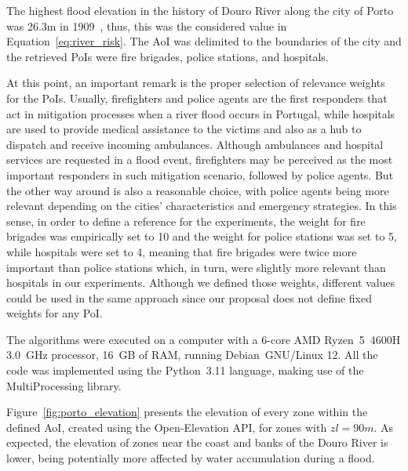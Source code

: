 \begin{refsection}
The highest flood elevation in the history of Douro River along the city of Porto was 26.3m in 1909~\cite{inundacaodouro}, thus, this was the considered value in Equation~\ref{eq:river_risk}. The AoI was delimited to the boundaries of the city and the retrieved PoIs were fire brigades, police stations, and hospitals. 

At this point, an important remark is the proper selection of relevance weights for the PoIs. Usually, firefighters and police agents are the first responders that act in mitigation processes when a river flood occurs in Portugal, while hospitals are used to provide medical assistance to the victims and also as a hub to dispatch and receive incoming ambulances. Although ambulances and hospital services are requested in a flood event, firefighters may be perceived as the most important responders in such mitigation scenario, followed by police agents. But the other way around is also a reasonable choice, with police agents being more relevant depending on the cities' characteristics and emergency strategies. In this sense, in order to define a reference for the experiments, the weight for fire brigades was empirically set to 10 and the weight for police stations was set to 5, while hospitals were set to 4, meaning that fire brigades were twice more important than police stations which, in turn, were slightly more relevant than hospitals in our experiments. Although we defined those weights, different values could be used in the same approach since our proposal does not define fixed weights for any PoI. 

The algorithms were executed on a computer with a 6-core AMD Ryzen~5~4600H 3.0~GHz processor, 16~GB of RAM, running Debian~GNU/Linux 12. All the code was implemented using the Python~3.11 language, making use of the MultiProcessing library.

Figure~\ref{fig:porto_elevation} presents the elevation of every zone within the defined AoI, created using the Open-Elevation API, for zones with $zl = 90m$. As expected, the elevation of zones near the coast and banks of the Douro River is lower, being potentially more affected by water accumulation during a flood.


\end{refsection}
